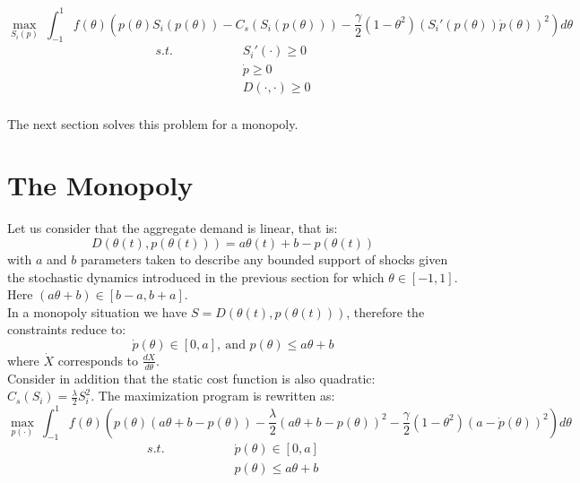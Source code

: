 \begin{equation}
\displaystyle{\max_{S_i(p)}}~\int_{-1}^{1} f(\theta)\left(p(\theta)S_i(p(\theta)) -C_s(S_i(p(\theta)))-\frac{\gamma}{2}(1-\theta^2)\left(S_i'(p(\theta))\dot{p}(\theta)\right)^2\right)d\theta
\end{equation}
\begin{eqnarray} 
s.t.\hspace{2cm}&S_i'(\cdot)\geq0 \nonumber\\
&\dot{p}\geq0\\
&D(\cdot,\cdot)\geq0 \nonumber\\
\end{eqnarray}

The next section solves this problem for a monopoly. 



\section{The Monopoly}\label{monosolve}
Let us consider that the aggregate demand is linear, that is: $$D(\theta(t),p(\theta(t)))=a\theta(t)+b-p(\theta(t))$$
with $a$ and $b$ parameters taken to describe any bounded support of shocks given the stochastic dynamics introduced in the previous section for which $\theta\in[-1,1]$. Here $(a\theta+b)\in[b-a,b+a]$.\\

In a monopoly situation we have $S=D(\theta(t),p(\theta(t)))$, therefore the constraints reduce to: $$\dot{p}(\theta)\in[0,a],~\textrm{and }p(\theta)\leq a\theta+b$$
where $\dot{X}$ corresponds to $\frac{dX}{d\theta}$. \\

Consider in addition that the static cost function is also quadratic: $C_s(S_i)=\frac{\lambda}{2}S_i^2$. The maximization program is rewritten as: 
\begin{equation}
\displaystyle{\max_{p(\cdot)}}~\int_{-1}^{1} f(\theta)\left(p(\theta)(a\theta+b-p(\theta)) -\frac{\lambda}{2}(a\theta+b-p(\theta))^2-\frac{\gamma}{2}(1-\theta^2)\left(a-\dot{p}(\theta)\right)^2\right)d\theta
\end{equation}
\begin{eqnarray}
s.t.\hspace{2cm}&\dot{p}(\theta)\in[0,a] \nonumber\\
&p(\theta)\leq a\theta+b \nonumber
\end{eqnarray}


